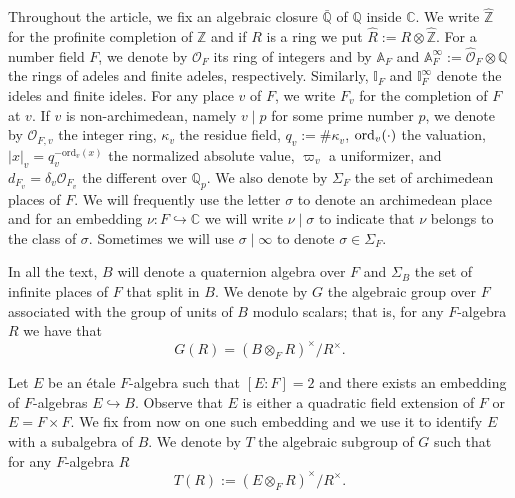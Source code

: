 \documentclass{amsart}
\theoremstyle{definition}
\theoremstyle{remark}
\numberwithin{equation}{section}
\newcommand{\Z}{{\mathbb Z}}
\newcommand{\A}{{\mathbb A}}
\newcommand{\Q}{{\mathbb Q}}
\newcommand{\C}{{\mathbb C}}
\newcommand{\I}{{\mathbb I}}
\newcommand{\cO}{{\mathcal O}}
\begin{document}
Throughout the article, we fix an algebraic closure $\bar\Q$ of $\Q$ inside $\C$.
We write $\hat\Z$ for the profinite completion of $\Z$ and if $R$ is a ring we put $\hat R:=R\otimes\hat\Z$. For a number field $F$, we denote by $\cO_F$ its ring of integers and by $\A_F$ and $\A_F^\infty:=\hat\cO_F\otimes\Q$ the rings of adeles and finite adeles, respectively. Similarly, $\I_F$ and $\I_F^\infty$ denote the ideles and finite ideles. For any place $v$ of $F$, we write $F_v$ for the completion of $F$ at $v$. If $v$ is non-archimedean, namely $v\mid p$ for some prime number $p$, we denote by $\cO_{F,v}$ the integer ring, $\kappa_v$ the residue field, $q_v:=\#\kappa_v$, ${\rm ord}_v(\cdot)$ the valuation, $|x|_v = q_v^{-\mathrm{ord}_v(x)}$ the normalized absolute value, $\varpi_v$ a uniformizer, and $d_{F_v}=\delta_v\cO_{F_v}$ the different over $\Q_p$. We also denote by $\Sigma_F$ the set of archimedean places of $F$. We will frequently use the letter $\sigma$ to denote an archimedean place and for an embedding $\nu \colon F\hookrightarrow \C$ we will write $\nu \mid \sigma$ to indicate that $\nu$ belongs to the class of $\sigma$. Sometimes we will use $\sigma\mid\infty$ to denote $\sigma\in\Sigma_F$.

In all the text, $B$ will denote a quaternion algebra over $F$ and $\Sigma_B$ the set of infinite places of $F$ that split in $B$. We denote by $G$ the algebraic group over $F$ associated with the group of units of $B$ modulo scalars; that is, for any $F$-algebra $R$ we have that
\[
G(R)=(B\otimes_{F}R)^\times/R^\times.
\]
 

Let $E$ be an étale $F$-algebra such that $[E\colon F]=2$ and there exists an embedding of $F$-algebras $ E\hookrightarrow B$. Observe that $E$ is either a quadratic field extension of $F$ or $E=F\times F$. We fix from now on one such embedding and we use it to identify $E$ with a subalgebra of $B$. We denote by $T$ the algebraic subgroup of $G$ such that for any $F$-algebra $R$
\[
T(R):=(E \otimes_{F}R)^\times/R^\times.
\]
\end{document}
